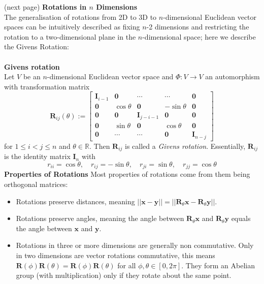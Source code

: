\documentclass{report}
\begin{document}
(next page)
\newpage
\noindent\textbf{Rotations in $n$ Dimensions}\\
The generalisation of rotations from 2D to 3D to $n$-dimensional Euclidean vector spaces can be intuitively
described as fixing $n$-2 dimensions and restricting the 
rotation to a two-dimensional plane in the $n$-dimensional space; here we describe the Givens Rotation:\\
\vspace{1mm}\\
\textbf{Givens rotation}\\
Let $V$ be an $n$-dimensional Euclidean vector space and $\Phi:V\to V$ an automorphism with transformation matrix
\begin{equation*}
\bm{R}_{ij}(\theta):=\begin{bmatrix}
\bm{I}_{i-1}&\bm{0}&\cdots&\cdots&\bm{0}\\
\bm{0}&\cos\theta&\bm{0}&-\sin\theta&\bm{0}\\
\bm{0}&\bm{0}&\bm{I}_{j-i-1}&\bm{0}&\bm{0}\\
\bm{0}&\sin\theta&\bm{0}&\cos\theta&\bm{0}\\
\bm{0}&\cdots&\cdots&\bm{0}&\bm{I}_{n-j}
\end{bmatrix}
\end{equation*}
for $1\leq i<j\leq n$ and $\theta\in\mathbb{R}$. Then $\bm{R}_{ij}$ is called a \textit{Givens rotation}.
Essentially, $\bm{R}_{ij}$ is the identity matrix $\bm{I}_n$ with
\begin{equation*}
r_{ii}=\cos\theta,\quad r_{ij}=-\sin\theta,\quad
r_{ji}=\sin\theta,\quad r_{jj}=\cos\theta
\end{equation*}
\textbf{Properties of Rotations}
Most properties of rotations come from them being orthogonal matrices:
\begin{itemize}
\item Rotations preserve distances, meaning $||\bm{x}-\bm{y}||=||\bm{R}_\theta\bm{x}-\bm{R}_\theta\bm{y}||$.
\item Rotations preserve angles, meaning the angle between
$\bm{R}_\theta\bm{x}$ and $\bm{R}_\theta\bm{y}$ equals the angle between $\bm{x}$ and $\bm{y}$.
\item Rotations in three or more dimensions are generally non commutative. 
Only in two dimensions are vector rotations commutative, this means 
$\bm{R}(\phi)\bm{R}(\theta)=\bm{R}(\phi)\bm{R}(\theta)$
for all $\phi,\theta\in[0,2\pi]$. They form an Abelian group (with multiplication) only
if they rotate about the same point.
\end{itemize}
\newpage
\end{document}
